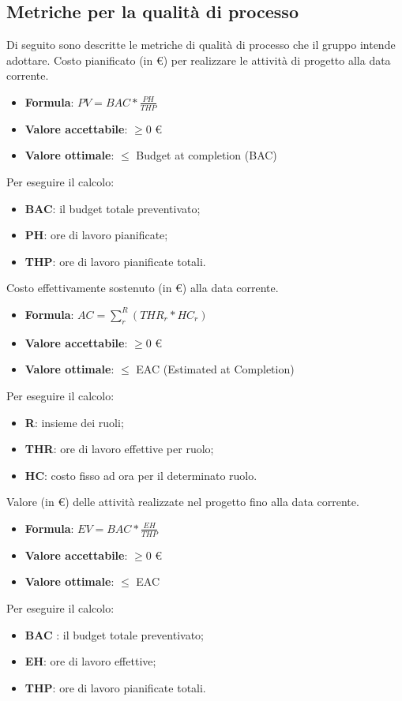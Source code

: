 \subsection{Metriche per la qualità di processo}
Di seguito sono descritte le metriche di qualità di processo che il gruppo intende adottare.
Costo pianificato (in \euro) per realizzare le attività di progetto alla data corrente.
\begin{itemize}
    \item \textbf{Formula}: $PV = BAC * \frac{PH}{THP}$
    \item \textbf{Valore accettabile}: $\geq0$ \euro
    \item \textbf{Valore ottimale}: $\leq$ Budget at completion (BAC)
\end{itemize}  
Per eseguire il calcolo:
\begin{itemize}
    \item \textbf{BAC}: il budget totale preventivato;
    \item \textbf{PH}: ore di lavoro pianificate;
    \item \textbf{THP}: ore di lavoro pianificate totali.
\end{itemize}

Costo effettivamente sostenuto (in \euro) alla data corrente. 
\begin{itemize}
    \item \textbf{Formula}: $AC = \sum_{r}^{R}(THR_r*HC_r)$
    \item \textbf{Valore accettabile}: $\geq0$ \euro
    \item \textbf{Valore ottimale}: $\leq$ EAC (Estimated at Completion)
\end{itemize}  
Per eseguire il calcolo:
\begin{itemize}
    \item \textbf{R}: insieme dei ruoli;
    \item \textbf{THR}: ore di lavoro effettive per ruolo;
    \item \textbf{HC}: costo fisso ad ora per il determinato ruolo.
\end{itemize}

Valore (in \euro) delle attività realizzate nel progetto fino alla data corrente. 
\begin{itemize}
    \item \textbf{Formula}: $EV=BAC*\frac{EH}{THP}$
    \item \textbf{Valore accettabile}: $\geq0$ \euro
    \item \textbf{Valore ottimale}: $\leq$ EAC
\end{itemize}  
Per eseguire il calcolo:
\begin{itemize}
    \item \textbf{BAC} : il budget totale preventivato;
    \item \textbf{EH}: ore di lavoro effettive;
    \item \textbf{THP}: ore di lavoro pianificate totali.
\end{itemize}

